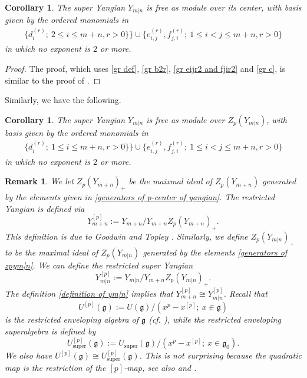 \documentclass[12pt,reqno]{amsart}
\newcommand{\fg}{\mathfrak{g}}
\DeclareMathOperator{\super}{super}
\numberwithin{equation}{section}
\newtheorem{Corollary}[Theorem]{Corollary}
\newtheorem{Remark}[Theorem]{Remark}
\theoremstyle{Theorem}
\theoremstyle{remark}
\numberwithin{equation}{section}
\begin{document}
\begin{Corollary}
The super Yangian $Y_{m|n}$ is free as module over its center, 
with basis given by the ordered monomials in
\begin{align}
\{d_i^{(r)};~2\leq i\leq m+n, r>0\}\}\cup\{e_{i,j}^{(r)},f_{j,i}^{(r)};~1\leq i<j\leq m+n, r>0\}
\end{align}
in which no exponent is $2$ or more.
\end{Corollary}
\begin{proof}
The proof, which uses \eqref{gr def}, \eqref{gr b2r}, \eqref{gr eijr2 and fjir2} and \eqref{gr c},
is similar to the proof of \cite[Corollary 5.12]{BT18}.
\end{proof}
Similarly, we have the following.
\begin{Corollary}
The super Yangian $Y_{m|n}$ is free as module over $Z_p(Y_{m|n})$, 
with basis given by the ordered monomials in
\begin{align}
\{d_i^{(r)};~1\leq i\leq m+n, r>0\}\}\cup\{e_{i,j}^{(r)},f_{j,i}^{(r)};~1\leq i<j\leq m+n, r>0\}
\end{align}
in which no exponent is $2$ or more.
\end{Corollary}
\begin{Remark}
We let $Z_p(Y_{m+n})_+$ be the maixmal ideal of $Z_p(Y_{m+n})$ generated by the elements given in \eqref{generators of p-center of yangian}.
The {\it restricted Yangian} is defined via 
\[
Y^{[p]}_{m+n}:=Y_{m+n}/Y_{m+n}Z_p(Y_{m+n})_+.
\]
This definition is due to Goodwin and Topley \cite[Section 4.3]{GT21}.
Similarly, 
we define $Z_p(Y_{m|n})_+$ to be the maximal ideal of $Z_p(Y_{m|n})$ generated by the elements \eqref{generators of zpym|n}.
We can define the {\it restricted super Yangian} 
\[
Y^{[p]}_{m|n}:=Y_{m|n}/Y_{m+n}Z_p(Y_{m|n})_+.   
\]
The definition \eqref{definition of ym|n} implies that $Y^{[p]}_{m+n}\cong Y^{[p]}_{m|n}$.
Recall that 
\[
U^{[p]}(\fg):=U(\fg)/(x^p-x^{[p]};~x\in \fg)
\]
is the {\it restricted enveloping algebra} of $\fg$ (cf. \cite[Section 2.7]{Jan98}),
while the restricted enveloping superalgebra is defined by
\[
U_{\super}^{[p]}(\fg):=U_{\super}(\fg)/(x^p-x^{[p]};~x\in \fg_{\bar 0}).   
\]
We also have $U^{[p]}(\fg)\cong U_{\super}^{[p]}(\fg)$.
This is not surprising because the quadratic map is the restriction of the $[p]$-map,
see also \cite{Bou+23} and \cite[Section 3.10]{EH25}.
\end{Remark}
\end{document}
